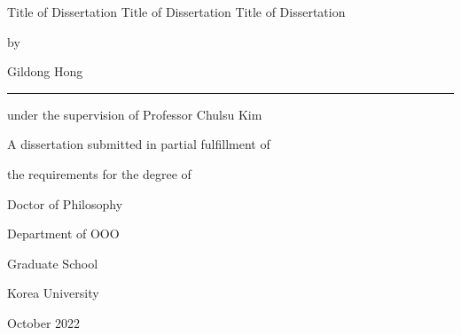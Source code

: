 \documentclass[11pt]{report}
\begin{document}
\newpage 
\begin{center}
\huge Title of Dissertation Title of Dissertation Title of Dissertation 
\par\vspace{3.3cm} %
{\fontsize{16pt}{16pt}\selectfont by \par Gildong Hong \par} %
\vspace{1.0cm}
\rule{.6\textwidth}{0.4pt} %
\par\vspace{0.2cm}
{\fontsize{16pt}{18pt}\selectfont under the supervision of Professor Chulsu Kim \par 
\vspace{0.7cm}
A dissertation submitted in partial fulfillment of \par
the requirements for the degree of \par
Doctor of Philosophy \par } 
\vspace{10pt}
{\fontsize{16pt}{16pt}\selectfont Department of OOO \par }  %
\vspace{1.5cm}
{\fontsize{18pt}{18pt}\selectfont Graduate School \par\vspace{0.2cm}
 Korea University \par} 
\vspace{1cm}
{\fontsize{14pt}{14pt}\selectfont October 2022} %
\end{center}


\end{document}
